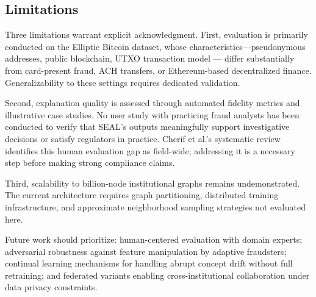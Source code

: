 \subsection{Limitations}
\label{subsec:limitations}

Three limitations warrant explicit acknowledgment. First, evaluation is primarily conducted on the Elliptic Bitcoin dataset, whose characteristics—pseudonymous addresses, public blockchain, UTXO transaction model — differ substantially from card-present fraud, ACH transfers, or Ethereum-based decentralized finance. Generalizability to these settings requires dedicated validation.

Second, explanation quality is assessed through automated fidelity metrics and illustrative case studies. No user study with practicing fraud analysts has been conducted to verify that SEAL's outputs meaningfully support investigative decisions or satisfy regulators in practice. Cherif et al.'s systematic review \citep{cherif2024survey} identifies this human evaluation gap as field-wide; addressing it is a necessary step before making strong compliance claims.

Third, scalability to billion-node institutional graphs remains undemonstrated. The current architecture requires graph partitioning, distributed training infrastructure, and approximate neighborhood sampling strategies not evaluated here.

Future work should prioritize: human-centered evaluation with domain experts; adversarial robustness against feature manipulation by adaptive fraudsters; continual learning mechanisms for handling abrupt concept drift without full retraining; and federated variants enabling cross-institutional collaboration under data privacy constraints.